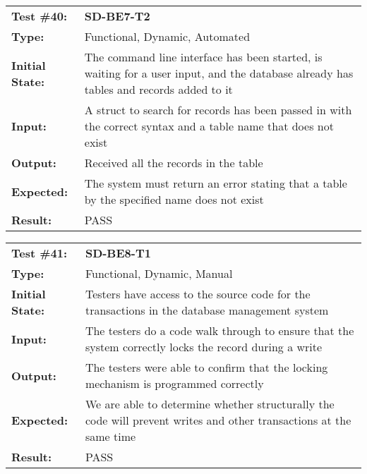 \documentclass[12pt, titlepage]{article}
\begin{document}
\begin{mdframed}[linewidth=1pt]
\begin{tabularx}{\textwidth}{@{}p{3cm}X@{}}
{\bf Test \#40:} & {\bf SD-BE7-T2}\\[\baselineskip]
{\bf Type:} & Functional, Dynamic, Automated \\[0.5\baselineskip]
{\bf Initial State:} & The command line interface has been started, is waiting for a user input, and the database already has tables and records added to it \\[\baselineskip]
{\bf Input:} & A struct to search for records has been passed in with the correct syntax and a table name that does not exist \\[\baselineskip]
{\bf Output:} & Received all the records in the table \\[\baselineskip]
{\bf Expected:} & The system must return an error stating that a table by the specified name does not exist \\[\baselineskip]
{\bf Result:} & PASS
\end{tabularx}
\end{mdframed}

\begin{mdframed}[linewidth=1pt]
\begin{tabularx}{\textwidth}{@{}p{3cm}X@{}}
{\bf Test \#41:} & {\bf SD-BE8-T1}\\[\baselineskip]
{\bf Type:} & Functional, Dynamic, Manual \\[0.5\baselineskip]
{\bf Initial State:} & Testers have access to the source code for the transactions in the database management system \\[\baselineskip]
{\bf Input:} & The testers do a code walk through to ensure that the system correctly locks the record during a write \\[\baselineskip]
{\bf Output:} & The testers were able to confirm that the locking mechanism is programmed correctly \\[\baselineskip]
{\bf Expected:} & We are able to determine whether structurally the code will prevent writes and other transactions at the same time \\[\baselineskip]
{\bf Result:} & PASS
\end{tabularx}
\end{mdframed}
\end{document}
